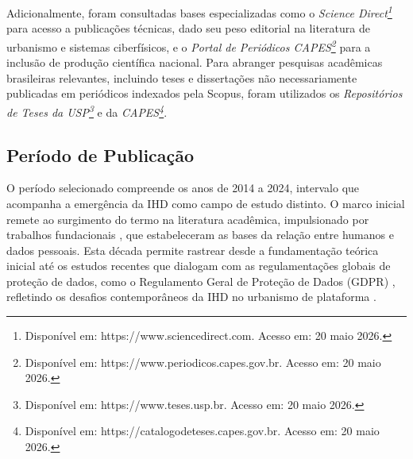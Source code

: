 \documentclass[12pt]{article}
\begin{document}
    Adicionalmente, foram consultadas bases especializadas como o \emph{Science Direct\footnote{Disponível em: https://www.sciencedirect.com. Acesso em: 20 maio 2026.}} para acesso a publicações técnicas, dado seu peso editorial na literatura de urbanismo e sistemas ciberfísicos, e o \emph{Portal de Periódicos CAPES\footnote{Disponível em: https://www.periodicos.capes.gov.br. Acesso em: 20 maio 2026.}} para a inclusão de produção científica nacional. Para abranger pesquisas acadêmicas brasileiras relevantes, incluindo teses e dissertações não necessariamente publicadas em periódicos indexados pela Scopus, foram utilizados os \emph{Repositórios de Teses da USP\footnote{Disponível em: https://www.teses.usp.br. Acesso em: 20 maio 2026.}} e da \emph{CAPES\footnote{Disponível em: https://catalogodeteses.capes.gov.br. Acesso em: 20 maio 2026.}}.
    


\subsection{Período de Publicação}

   O período selecionado compreende os anos de 2014 a 2024, intervalo que acompanha a emergência da IHD como campo de estudo distinto. O marco inicial remete ao surgimento do termo na literatura acadêmica, impulsionado por trabalhos fundacionais \cite{mortier2015humandatainteractionhumanface,Hornung2015}, que estabeleceram as bases da relação entre humanos e dados pessoais. Esta década permite rastrear desde a fundamentação teórica inicial até os estudos recentes que dialogam com as regulamentações globais de proteção de dados, como o Regulamento Geral de Proteção de Dados (GDPR) \cite{gdpr2016}, refletindo os desafios contemporâneos da IHD no urbanismo de plataforma \cite{Belizario2023Interacao,chalhoub2024useful,coleti2024grandihc}.
\end{document}
